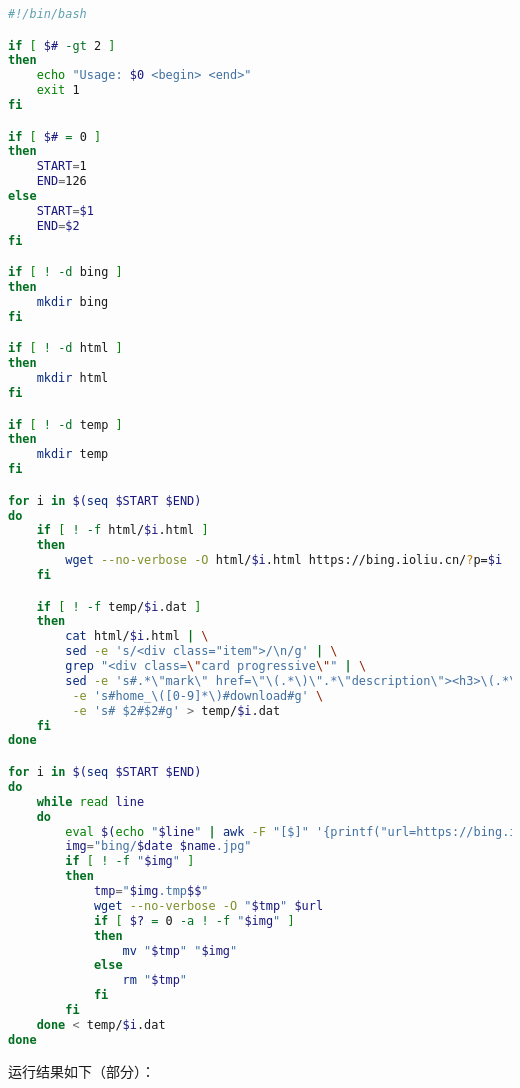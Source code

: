 \documentclass[blue,normal,cn]{elegantnote}
\begin{document}
\begin{lstlisting}[language=bash]
#!/bin/bash

if [ $# -gt 2 ]
then
	echo "Usage: $0 <begin> <end>"
	exit 1
fi

if [ $# = 0 ]
then
	START=1
	END=126
else
	START=$1
	END=$2
fi

if [ ! -d bing ]
then 
	mkdir bing
fi

if [ ! -d html ]
then 
	mkdir html
fi

if [ ! -d temp ]
then 
	mkdir temp
fi

for i in $(seq $START $END)
do
	if [ ! -f html/$i.html ]
	then
		wget --no-verbose -O html/$i.html https://bing.ioliu.cn/?p=$i
	fi

	if [ ! -f temp/$i.dat ]
	then
		cat html/$i.html | \
		sed -e 's/<div class="item">/\n/g' | \
		grep "<div class=\"card progressive\"" | \
		sed -e 's#.*\"mark\" href=\"\(.*\)\".*\"description\"><h3>\(.*\)(©.*\([0-9]\{4\}\-[0-9]\{2\}-[0-9]\{2\}\)<.*#\1$\2$\3#g' \
		 -e 's#home_\([0-9]*\)#download#g' \
		 -e 's# $2#$2#g' > temp/$i.dat
	fi
done

for i in $(seq $START $END)
do
	while read line
	do
 		eval $(echo "$line" | awk -F "[$]" '{printf("url=https://bing.ioliu.cn%s;name=\"%s\";date=%s",$1,$2,$3)}')
		img="bing/$date $name.jpg"
		if [ ! -f "$img" ]
 		then
			tmp="$img.tmp$$"
			wget --no-verbose -O "$tmp" $url
			if [ $? = 0 -a ! -f "$img" ]
			then
				mv "$tmp" "$img"
			else
				rm "$tmp"
			fi
		fi
	done < temp/$i.dat
done
\end{lstlisting}

运行结果如下（部分）：
\end{document}
